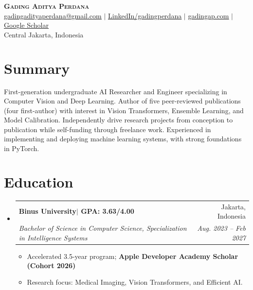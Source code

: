 \documentclass[letterpaper,11pt]{article}
\makeatletter
\newcommand{\resumeItem}[1]{
  \item\small{
    {#1 \vspace{-2pt}}
  }
}
\newcommand{\resumeSubheading}[4]{
  \vspace{-2pt}\item
    \begin{tabular*}{0.97\textwidth}[t]{l@{\extracolsep{\fill}}r}
      \textbf{#1} & #2 \\
      \textit{\small#3} & \textit{\small #4} \\
    \end{tabular*}\vspace{-7pt}
}
\newcommand{\resumeSubHeadingListStart}{\begin{itemize}[leftmargin=0.15in, label={}]}
\newcommand{\resumeSubHeadingListEnd}{\end{itemize}}
\newcommand{\resumeItemListStart}{\begin{itemize}}
\newcommand{\resumeItemListEnd}{\end{itemize}\vspace{-5pt}}
\makeatother
\begin{document}
\begin{center}
    \textbf{\Huge \scshape Gading Aditya Perdana} \\ \vspace{1pt}
    \href{mailto:gadingadityaperdana@gmail.com}{\underline{gadingadityaperdana@gmail.com}} $|$ 
    \href{https://www.linkedin.com/in/gadingadityaperdana/}{\underline{LinkedIn/gadingperdana}} $|$
    \href{https://gadingap.com/}{\underline{gadingap.com}} $|$
    \href{https://scholar.google.com/citations?user=hwbWuI0AAAAJ}{\underline{Google Scholar}} \\ \vspace{1pt}
    \small Central Jakarta, Indonesia
\end{center}

\vspace{-6ex}
\section{\textbf{Summary}}
First-generation undergraduate AI Researcher and Engineer specializing in Computer Vision and Deep Learning. Author of five peer-reviewed publications (four first-author) with interest in Vision Transformers, Ensemble Learning, and Model Calibration. Independently drive research projects from conception to publication while self-funding through freelance work. Experienced in implementing and deploying machine learning systems, with strong foundations in PyTorch.

\vspace{-2ex}
\section{\textbf{Education}}
  \resumeSubHeadingListStart
    \resumeSubheading
      {Binus University{\normalfont\small\enspace$|$ GPA: 3.63/4.00}}{Jakarta, Indonesia}
      {Bachelor of Science in Computer Science, Specialization in Intelligence Systems}{Aug. 2023 -- Feb 2027}
      \resumeItemListStart
        \resumeItem{Accelerated 3.5-year program; \textbf{Apple Developer Academy Scholar (Cohort 2026)}}
        \resumeItem{Research focus: Medical Imaging, Vision Transformers, and Efficient AI.}
      \resumeItemListEnd
  \resumeSubHeadingListEnd
\vspace{-3ex}

\end{document}
